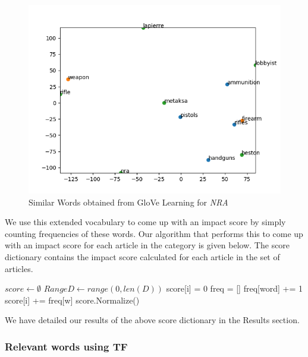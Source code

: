 \documentclass[paper=a4, fontsize=11pt]{scrartcl}
\numberwithin{equation}{section}		%
\numberwithin{figure}{section}			%
\numberwithin{table}{section}				%
\begin{document}
\begin{figure}[ht]
	\centering
 	 \includegraphics[width=0.5\linewidth]{similar_words_nra.png}
	  \caption{Similar Words obtained from GloVe Learning for \textit{NRA}}
 	 \label{fig:Similar Words for NRA}
\end{figure}

We use this extended vocabulary to come up with an impact score by simply counting frequencies of these words. Our algorithm that performs this to come up with an impact score for each article in the category is given below. The score dictionary contains the impact score calculated for each article in the set of articles.

\begin {center}
\begin {algorithm}[ht]
\SetNoFillComment
\caption{Calculate Impact Score for each article from a list of articles, given extended vocabulary}
 {
    $score \gets \emptyset $\;
    $RangeD \gets range(0, len(D)) $\;
     {
    	score[i] = 0 \;
	freq = [] \;
	 {
		freq[word] += 1 \;
	}
	 {
		score[i] += freq[w] \;
	}
    }
    score.Normalize() \;
    \;
}
\end {algorithm}
\end {center}

We have detailed our results of the above score dictionary in the Results section.

\subsubsection {Relevant words using TF}
\end{document}
